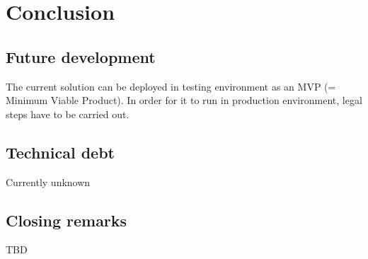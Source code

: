 \chapter{Conclusion}

\section{Future development}

The current solution can be deployed in testing environment as an MVP (= Minimum Viable Product). In order for it to run in production environment, legal steps have to be carried out.

\section{Technical debt}
Currently unknown

\section{Closing remarks}
TBD